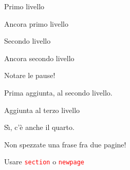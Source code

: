 \documentclass[12pt,italian,oneside]{report}
\newcommand{\rosso}[1]{\textcolor{red}{#1}}
\begin{document}
\begin{firstheadlineitemize}

\item Primo livello

\pause

\item Ancora primo livello

\pause

\begin{secondheadlineitemize}

\item Secondo livello

\pause

\item Ancora secondo livello

\end{secondheadlineitemize}

\pause

\item Notare le pause!

\pause

\begin{secondheadlineitemize}

\item Prima aggiunta, al secondo livello.

\pause

\begin{thirdheadlineitemize}

\item Aggiunta al terzo livello

\pause

\begin{fourthheadlineitemize}

\item S\`{\i}, c'\`{e} anche il quarto.

\pause

\end{fourthheadlineitemize}

\end{thirdheadlineitemize}

\end{secondheadlineitemize}

\item Non spezzate una frase fra due pagine!

\pause

\begin{secondheadlineitemize}

\item Usare \rosso{\texttt{section}} o \rosso{\texttt{\symbol{92}newpage}}

\end{secondheadlineitemize}

\end{firstheadlineitemize}
\end{document}

